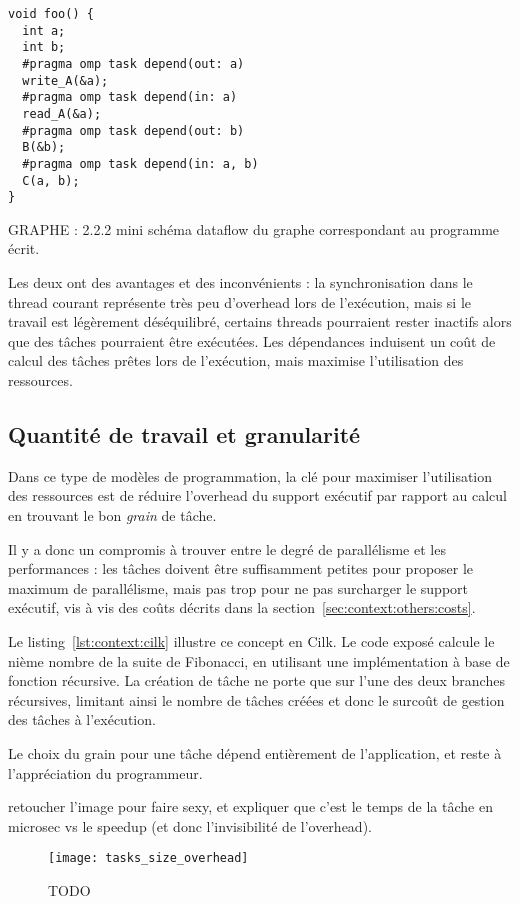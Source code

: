 \begin{lstlisting}[caption=Synchronisation via des dépendances (OpenMP),label=lst:context:task-dep]
void foo() {
  int a;
  int b;
  #pragma omp task depend(out: a)
  write_A(&a);
  #pragma omp task depend(in: a)
  read_A(&a);
  #pragma omp task depend(out: b)
  B(&b);
  #pragma omp task depend(in: a, b)
  C(a, b);
}
\end{lstlisting}

GRAPHE : 2.2.2 mini schéma dataflow du graphe correspondant au programme écrit.

Les deux ont des avantages et des inconvénients : la synchronisation dans le thread courant représente très peu d'overhead lors de l'exécution, mais si le travail est légèrement déséquilibré, certains threads pourraient rester inactifs alors que des tâches pourraient être exécutées.
Les dépendances induisent un coût de calcul des tâches prêtes lors de l'exécution, mais maximise l'utilisation des ressources.


\subsection{Quantité de travail et granularité}

Dans ce type de modèles de programmation, la clé pour maximiser l'utilisation des ressources est de réduire l'overhead du support exécutif par rapport au calcul en trouvant le bon \emph{grain} de tâche.

Il y a donc un compromis à trouver entre le degré de parallélisme et les performances : les tâches doivent être suffisamment petites pour proposer le maximum de parallélisme, mais pas trop pour ne pas surcharger le support exécutif, vis à vis des coûts décrits dans la section~\ref{sec:context:others:costs}.

Le listing~\ref{lst:context:cilk} illustre ce concept en Cilk.
Le code exposé calcule le nième nombre de la suite de Fibonacci, en utilisant une implémentation à base de fonction récursive.
La création de tâche ne porte que sur l'une des deux branches récursives, limitant ainsi le nombre de tâches créées et donc le surcoût de gestion des tâches à l'exécution.

Le choix du grain pour une tâche dépend entièrement de l'application, et reste à l'appréciation du programmeur.

\begin{todo}
  retoucher l'image pour faire sexy, et expliquer que c'est le temps de la tâche en microsec vs le speedup (et donc l'invisibilité de l'overhead).
\end{todo}
\begin{figure}[ht]
	\centering
	\texttt{[image: tasks\_size\_overhead]}
	\caption{TODO}\label{fig:context:tasks:granularity}
\end{figure}


